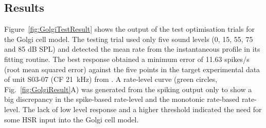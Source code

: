 







 \subsection{Results}

 Figure~\ref{fig:GolgiTestResult} shows the output of the test optimisation
 trials for the Golgi cell model.  The testing trial used only five sound levels
 (0, 15, 55, 75 and 85 dB SPL) and detected the mean rate from the instantaneous
 profile in its fitting routine. The best response obtained a minimum error of
 11.63 spikes/s (root mean squared error) against the five points in the target
 experimental data of unit S03-07 (CF 21~kHz) from \citep{GhoshalKim:1996}. A
 rate-level curve (green circles, Fig.~\ref{fig:GolgiResult}A) was generated
 from the spiking output only to show a big discrepancy in the spike-based
 rate-level and the monotonic rate-based rate-level. The lack of low level
 response and a higher threshold indicated the need for some HSR input into the
 Golgi cell model.


